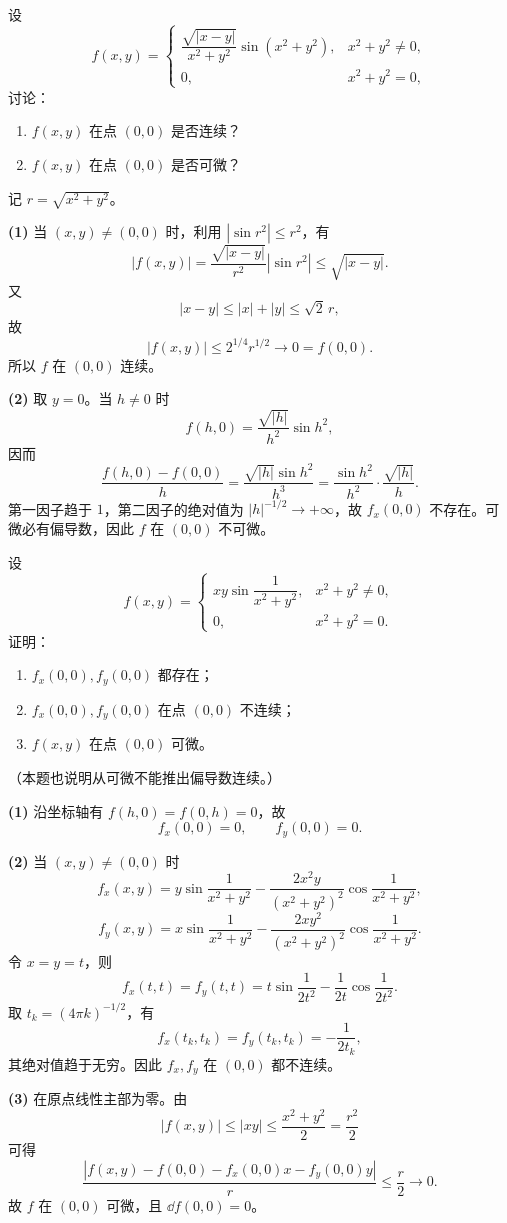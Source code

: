 \begin{xexercise}[1]
设
  \[
    f(x,y)=
    \begin{cases}
      \dfrac{\sqrt{|x-y|}}{x^2+y^2}\sin(x^2+y^2), & x^2+y^2\ne0,\\
      0, & x^2+y^2=0,
    \end{cases}
  \]
  讨论：
  \begin{enumerate}[label=(\arabic*)]
    \item $f(x,y)$ 在点 $(0,0)$ 是否连续？
    \item $f(x,y)$ 在点 $(0,0)$ 是否可微？
  \end{enumerate}
\end{xexercise}
\begin{xsolution}
记 $r=\sqrt{x^2+y^2}$。

\textbf{(1)} 当 $(x,y)\ne(0,0)$ 时，利用 $|\sin r^2|\le r^2$，有
\[
  |f(x,y)|
  =\frac{\sqrt{|x-y|}}{r^2}|\sin r^2|
  \le\sqrt{|x-y|}.
\]
又
\[
  |x-y|\le |x|+|y|\le\sqrt2\,r,
\]
故
\[
  |f(x,y)|\le 2^{1/4}r^{1/2}\to0=f(0,0).
\]
所以 $f$ 在 $(0,0)$ 连续。

\textbf{(2)} 取 $y=0$。当 $h\ne0$ 时
\[
  f(h,0)=\frac{\sqrt{|h|}}{h^2}\sin h^2,
\]
因而
\[
  \frac{f(h,0)-f(0,0)}h
  =\frac{\sqrt{|h|}\sin h^2}{h^3}
  =\frac{\sin h^2}{h^2}\cdot\frac{\sqrt{|h|}}h.
\]
第一因子趋于 $1$，第二因子的绝对值为 $|h|^{-1/2}\to+\infty$，故 $f_x(0,0)$ 不存在。可微必有偏导数，因此 $f$ 在 $(0,0)$ 不可微。
\end{xsolution}


\begin{xexercise}[2]
设
  \[
    f(x,y)=
    \begin{cases}
      xy\sin\dfrac1{x^2+y^2}, & x^2+y^2\ne0,\\
      0, & x^2+y^2=0.
    \end{cases}
  \]
  证明：
  \begin{enumerate}[label=(\arabic*)]
    \item $f_x(0,0),f_y(0,0)$ 都存在；
    \item $f_x(0,0),f_y(0,0)$ 在点 $(0,0)$ 不连续；
    \item $f(x,y)$ 在点 $(0,0)$ 可微。
  \end{enumerate}
  （本题也说明从可微不能推出偏导数连续。）
\end{xexercise}
\begin{xsolution}
\textbf{(1)} 沿坐标轴有 $f(h,0)=f(0,h)=0$，故
\[
  f_x(0,0)=0,
  \qquad
  f_y(0,0)=0.
\]

\textbf{(2)} 当 $(x,y)\ne(0,0)$ 时
\[
  f_x(x,y)=y\sin\frac1{x^2+y^2}
  -\frac{2x^2y}{(x^2+y^2)^2}\cos\frac1{x^2+y^2},
\]
\[
  f_y(x,y)=x\sin\frac1{x^2+y^2}
  -\frac{2xy^2}{(x^2+y^2)^2}\cos\frac1{x^2+y^2}.
\]
令 $x=y=t$，则
\[
  f_x(t,t)=f_y(t,t)
  =t\sin\frac1{2t^2}-\frac1{2t}\cos\frac1{2t^2}.
\]
取 $t_k=(4\pi k)^{-1/2}$，有
\[
  f_x(t_k,t_k)=f_y(t_k,t_k)=-\frac1{2t_k},
\]
其绝对值趋于无穷。因此 $f_x,f_y$ 在 $(0,0)$ 都不连续。

\textbf{(3)} 在原点线性主部为零。由
\[
  |f(x,y)|\le|xy|\le\frac{x^2+y^2}{2}=\frac{r^2}{2}
\]
可得
\[
  \frac{|f(x,y)-f(0,0)-f_x(0,0)x-f_y(0,0)y|}{r}
  \le\frac r2\to0.
\]
故 $f$ 在 $(0,0)$ 可微，且 $\dd f(0,0)=0$。
\end{xsolution}


